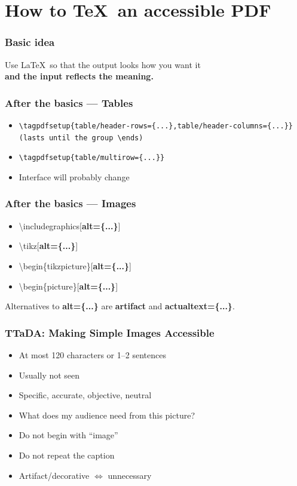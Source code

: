 \section{How to \TeX\ an accessible PDF}

\begin{frame}
\frametitle{Basic idea}
Use \LaTeX\ so that the output looks how you want it\\
\textbf{and the input reflects the meaning.}
\end{frame}

\begin{frame}
\frametitle{After the basics --- Tables}
\begin{itemize}
\item\texttt{\textbackslash tagpdfsetup\{table/header-rows=\{...\},table/header-columns=\{...\}\}\\
\qquad\qquad \textrm{(lasts until the group} \textbackslash ends)}
\item\texttt{\textbackslash tagpdfsetup\{table/multirow=\{...\}\}}
\item Interface will probably change
\end{itemize}
\end{frame}

\begin{frame}
\frametitle{After the basics --- Images}
\begin{itemize}
\ttfamily
\item\textbackslash includegraphics[\textbf{alt=\{...\}}]
\item\textbackslash tikz[\textbf{alt=\{...\}}]
\item\textbackslash begin\{tikzpicture\}[\textbf{alt=\{...\}}]
\item\textbackslash begin\{picture\}[\textbf{alt=\{...\}}]
\end{itemize}
Alternatives to {\bfseries\ttfamily alt=\{...\}} are {\bfseries\ttfamily artifact} and {\bfseries\ttfamily actualtext=\{...\}}.
\end{frame}

\begin{frame}
\frametitle{TTaDA: Making Simple Images Accessible}
\begin{itemize}
\item At most 120 characters or 1--2 sentences
\item Usually not seen
\item Specific, accurate, objective, neutral
\item What does my audience need from this picture?
\item Do not begin with ``image''
\item Do not repeat the caption
\item Artifact/decorative $\Leftrightarrow$ unnecessary
\end{itemize}
\end{frame}

